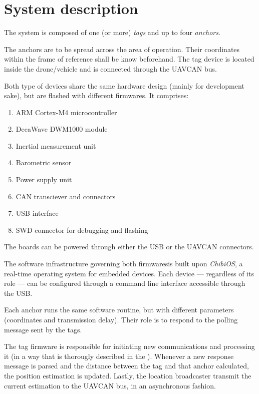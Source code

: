 \section{System description}

The system is composed of one (or more) \emph{tags} and up to four \emph{anchors}.

The anchors are to be spread across the area of operation.
Their coordinates within the frame of reference shall be know beforehand.
The tag device is located inside the drone/vehicle and is connected through the UAVCAN bus.

Both type of devices share the same hardware design (mainly for development sake), but are flashed with different firmwares.
It comprises:
\begin{enumerate}
\item ARM Cortex-M4 microcontroller
\item DecaWave DWM1000 module
\item Inertial measurement unit
\item Barometric sensor
\item Power supply unit
\item CAN transciever and connectors
\item USB interface
\item SWD connector for debugging and flashing
\end{enumerate}
The boards can be powered through either the USB or the UAVCAN connectors.

The software infrastructure governing both firmwaresis built upon \emph{ChibiOS}, a real-time operating system for embedded devices. 
Each device --- regardless of its role --- can be configured through a command line interface accessible through the USB.

Each anchor runs the same software routine, but with different parameters (coordinates and transmission delay). 
Their role is to respond to the polling message sent by the tags.

The tag firmware is responsible for initiating new communications and processing it (in a way that is thorougly described in the ).
Whenever a new response message is parsed and the distance between the tag and that anchor calculated, the position estimation is updated. 
Lastly, the location broadcaster transmit the current estimation to the UAVCAN bus, in an asynchronous fashion.

